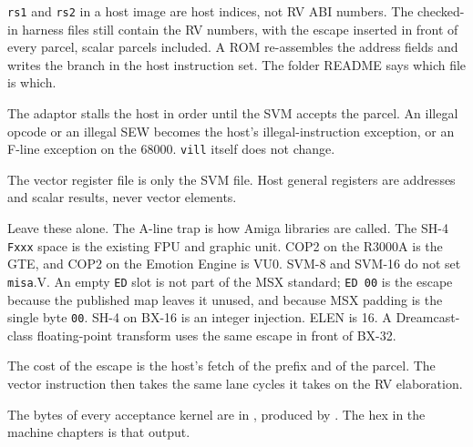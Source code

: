 \texttt{rs1} and \texttt{rs2} in a host image are host indices, not RV ABI numbers. The checked-in harness files still contain the RV numbers, with the escape inserted in front of every parcel, scalar parcels included. A ROM re-assembles the address fields and writes the branch in the host instruction set. The folder README says which file is which.

The adaptor stalls the host in order until the SVM accepts the parcel. An illegal opcode or an illegal SEW becomes the host's illegal-instruction exception, or an F-line exception on the 68000. \texttt{vill} itself does not change.

The vector register file is only the SVM file. Host general registers are addresses and scalar results, never vector elements.

Leave these alone. The A-line trap is how Amiga libraries are called. The SH-4 \texttt{Fxxx} space is the existing FPU and graphic unit. COP2 on the R3000A is the GTE, and COP2 on the Emotion Engine is VU0. SVM-8 and SVM-16 do not set \texttt{misa}.V. An empty \texttt{ED} slot is not part of the MSX standard; \texttt{ED 00} is the escape because the published map leaves it unused, and because MSX padding is the single byte \texttt{00}. SH-4 on BX-16 is an integer injection. ELEN is 16. A Dreamcast-class floating-point transform uses the same escape in front of BX-32.

The cost of the escape is the host's fetch of the prefix and of the parcel. The vector instruction then takes the same lane cycles it takes on the RV elaboration.

The bytes of every acceptance kernel are in , produced by . The hex in the machine chapters is that output.
